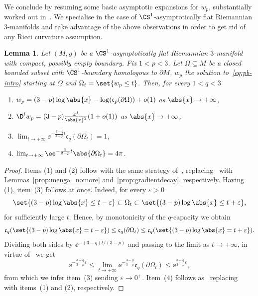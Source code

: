 \documentclass[10pt,a4paper]{amsart}
\numberwithin{equation}{section}
\newtheorem{Lemma}[Theorem]{Lemma}
\newcounter{case}
\renewcommand{\ncapa}{\mathfrak{c}}
\begin{document}
 We conclude by resuming some basic asymptotic expansions for $w_p$, substantially worked out in~\cite{benatti_asymptoticbehaviourcapacitarypotentials_2022}. We specialise in the case of $\CS^1$-asymptotically flat Riemannian $3$-manifolds and take advantage of the above observations in order to get rid of any Ricci curvature assumption.
\begin{Lemma}\label{lem:asylemma}
 Let $(M, g)$ be a $\CS^1$-asymptotically flat Riemannian $3$-manifold with compact, possibly empty boundary. Fix $1<p<3$. Let $\Omega\subseteq M$ be a closed bounded subset with $\CS^1$-boundary homologous to $\partial M$, $w_p$ the solution to~\eqref{eq:pb-intro} starting at $\Omega$ and $\Omega_t= \set{w_p \leq t}$. Then, for every $1<q<3$
 \begin{enumerate}\itemsep=0pt
 \item[$(1)$]%
 $ w_p = (3-p) \log \abs{x} -\log(\ncapa_p(\partial \Omega))+o(1)$ as $\abs{x} \to +\infty$,

 \item[$(2)$]%
 $ \D^iw_p = (3-p) \frac{x^i}{\abs{x}^2}(1+o(1))$ as $\abs{x} \to +\infty$,

 \item[$(3)$]%
 $ \lim_{t \to +\infty} \ee^{-\frac{3-q}{3-p}t}\ncapa_q(\partial \Omega_t)=1$,

 \item[$(4)$] %
 $ \lim_{t \to +\infty} \ee^{-\frac{2}{3-p}t}\abs{ \partial \Omega_t}=4 \pi$.
 \end{enumerate}
\end{Lemma}
\begin{proof}Items (1) and (2) follow with the same strategy of~\cite[Theorem~3.1]{benatti_asymptoticbehaviourcapacitarypotentials_2022}, replacing~\cite[Corollary~2.25 and Proposition 2.27]{benatti_asymptoticbehaviourcapacitarypotentials_2022} with Lemmas~\ref{prop:menga_nomore} and~\ref{prop:gradientdecay}, respectively. Having (1), item~(3) follows at once. Indeed, for every $\varepsilon>0$
\[
\set{(3-p)\log\abs{x}\leq t-\varepsilon} \subset \Omega_t \subset \set{(3-p) \log \abs{x} \leq t+\varepsilon},
\]
for sufficiently large $t$. Hence, by monotonicity of the $q$-capacity we obtain
\[
\ncapa_q(\set{(3-p)\log\abs{x}= t-\varepsilon}) \leq\ncapa_q( \partial \Omega_t)\leq \ncapa_q(\set{(3-p) \log \abs{x} = t+\varepsilon}).
\]
Dividing both sides by $\ee^{-(3-q)t/(3-p)}$ and passing to the limit as $t \to +\infty$, in virtue of~\cite[Lemma~2.21]{benatti_asymptoticbehaviourcapacitarypotentials_2022} we get
\[
 \ee^{- \frac{ 3-q}{3-p}\varepsilon} \leq \lim_{t \to +\infty} \ee^{-\frac{3-q}{3-p}} \ncapa_q(\partial \Omega_t)\leq \ee^{\frac{3-q}{3-p}\varepsilon },
\]
from which we infer item~(3) sending $\varepsilon\to 0^+$. Item~(4) follows as~\cite[Proposition~3.4]{benatti_asymptoticbehaviourcapacitarypotentials_2022} replacing~\cite[Theorems 1.1 and~3.1]{benatti_asymptoticbehaviourcapacitarypotentials_2022} with items~(1) and (2), respectively. \end{proof}
\end{document}
